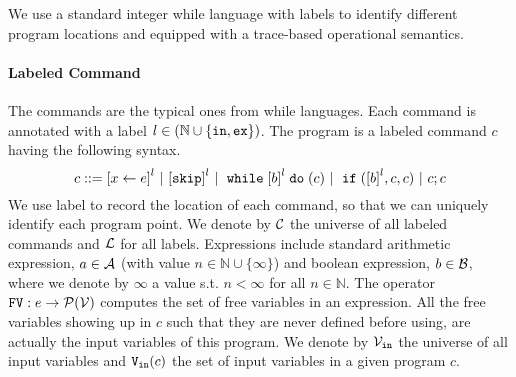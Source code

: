 We use a standard integer while language with labels to identify different program locations and equipped with a  trace-based operational semantics.
\paragraph{Labeled Command}
The commands are the typical ones from while languages. Each command is annotated with a label $l \in (\mathbb{N} \cup \{\mathtt{in}, \mathtt{ex}\})$. The program is a labeled command $c$ having the following syntax. 
\[
{c} ::= 
\clabel{\assign{x}{\expr}}^l 
~|~  \clabel{\eskip}^l
~|~ \ewhile \clabel{\bexpr}^{l} \edo ({c})
~|~ \eif(\clabel{\bexpr}^{l} , {c}, {c}) 
~|~ {c};{c} 
\]
We use label to record
the location of each command, so that we can uniquely identify each program point.
We denote by $\mathcal{C}$ the universe of all labeled commands and $\mathcal{L}$ for all labels.
Expressions include
standard arithmetic expression, $a \in \mathcal{A}$ (with value $n \in \mathbb{N} \cup \{ \infty\}$) and boolean expression, $b \in \mathcal{B}$, where we denote by $\infty$ a value s.t. $n < \infty $ for all $n \in \mathbb{N}$.
The operator $\mathtt{FV}: e \to \mathcal{P}(\mathcal{V})$ computes the set of free variables in an expression.
All the free variables
showing up in $c$ such that they are never defined before using, are actually the input variables of this program.
We denote by $\mathcal{V}_{\mathtt{in}}$ the universe of all input variables and $\mathtt{V_{\mathtt{in}}}(c)$ the set of input variables in a given program $c$.


